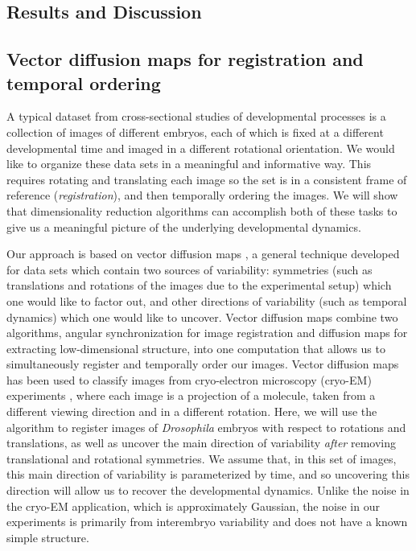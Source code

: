\documentclass{pnastwo}
\begin{document}
\begin{article}
\section{Results and Discussion}

\subsection{Vector diffusion maps for registration and temporal ordering}

A typical dataset from cross-sectional studies of developmental processes is a collection of images of different embryos, each of which is fixed at a different developmental time and imaged in a different rotational orientation.
%
We would like to organize these data sets in a meaningful and informative way.
%
This requires rotating and translating each image so the set is in a consistent frame of reference ({\it registration}), and then temporally ordering the images. 
%
We will show that dimensionality reduction algorithms can accomplish both of these tasks to give us a meaningful picture of the underlying developmental dynamics. 

Our approach is based on vector diffusion maps \cite{singer2012vector}, a general technique developed for data sets which contain two sources of variability:
symmetries (such as translations and rotations of the images due to the experimental setup) which one would like to factor out, and other directions of variability (such as temporal dynamics) which one would like to uncover.
%
Vector diffusion maps combine two algorithms, angular synchronization \cite{singer2011angular} for image registration and diffusion maps \cite{coifman2005geometric} for extracting low-dimensional structure, into one computation that allows us to simultaneously register and temporally order our images. 
%
Vector diffusion maps has been used to classify images from cryo-electron microscopy (cryo-EM) experiments \cite{...}, where each image is a projection of a molecule, taken from a different viewing direction and in a different rotation. 
%
Here, we will use the algorithm to register images of {\it Drosophila} embryos with respect to rotations and translations, as well as uncover the main direction of variability {\it after} removing translational and rotational symmetries.
%
We assume that, in this set of images, this main direction of variability is parameterized by time, and so uncovering this direction will allow us to recover the developmental dynamics. 
%
Unlike the noise in the cryo-EM application, which is approximately Gaussian, the noise in our experiments is primarily from interembryo variability and does not have a known simple structure.


\end{article}
\end{document}
